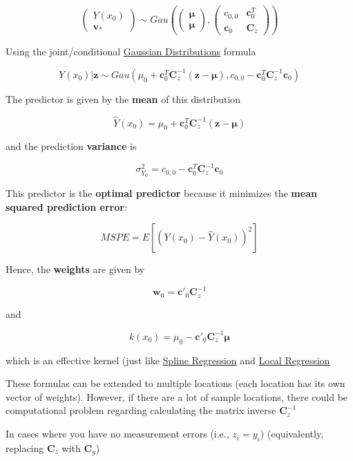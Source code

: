 \documentclass[
]{book}
\begin{document}
\[
\left(
\begin{array}
{c}
Y (x_0) \\
\mathbf{v}_*
\end{array}
\right)
\sim 
Gau 
\left(
\left(
\begin{array}
{c}
\mathbf{\mu} \\
\mathbf{\mu}
\end{array}
\right),
\left(
\begin{array}
{cc}
c_{0,0} & \mathbf{c}^T_0 \\
\mathbf{c}_0 & \mathbf{C}_{z}
\end{array}
\right)
\right)
\]

Using the joint/conditional \protect\hyperlink{gaussian-distributions}{Gaussian Distributions} formula

\[
Y(x_0)|\mathbf{z} \sim Gau (\mu_0+ \mathbf{c}^T_0 \mathbf{C}_z^{-1}(\mathbf{z}- \mathbf{\mu}), c_{0,0}- \mathbf{c}^T_0 \mathbf{C}_z^{-1} \mathbf{c}_0)
\]

The predictor is given by the \textbf{mean} of this distribution

\[
\hat{Y}(x_0) = \mu_0 + \mathbf{c}_0^T \mathbf{C}^{-1}_z(\mathbf{z} - \mathbf{\mu})
\]

and the prediction \textbf{variance} is

\[
\sigma^2_{Y_0} = c_{0,0} - \mathbf{c}^T_0 \mathbf{C}_z^{-1} \mathbf{c}_0
\]

This predictor is the \textbf{optimal predictor} because it minimizes the \textbf{mean squared prediction error}:

\[
MSPE = E[(Y(x_0) - \hat{Y}(x_0))^2]
\]

Hence, the \textbf{weights} are given by

\[
\mathbf{w}_0 = \mathbf{c}'_0 \mathbf{C}_z^{-1}
\]

and

\[
k(x_0) = \mu_0 - \mathbf{c}'_0 \mathbf{C}^{-1}_z \mathbf{\mu}
\]

which is an effective kernel (just like \protect\hyperlink{spline-regression}{Spline Regression} and \protect\hyperlink{local-regression}{Local Regression}

These formulas can be extended to multiple locations (each location has its own vector of weights). However, if there are a lot of sample locations, there could be computational problem regarding calculating the matrix inverse \(\mathbf{C}_z^{-1}\)

In cases where you have no measurement errors (i.e., \(z_i = y_i\)) (equivalently, replacing \(\mathbf{C}_z\) with \(\mathbf{C}_y\))
\end{document}
